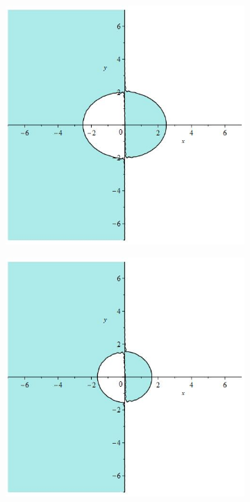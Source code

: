 \documentclass[12pt]{article}
\begin{document}
\begin{figure}[H]
\begin{subfigure}{0.24\textwidth}
    \end{subfigure}
    \begin{subfigure}{0.24\textwidth}
        \includegraphics[width=0.9\linewidth]{stabrks3_8.jpg}
        \label{fig:stabrks38}
    \end{subfigure}
    \begin{subfigure}{0.24\textwidth}
        \includegraphics[width=0.9\linewidth]{stabrks3_9.jpg}

\end{subfigure}
\end{figure}
\end{document}
